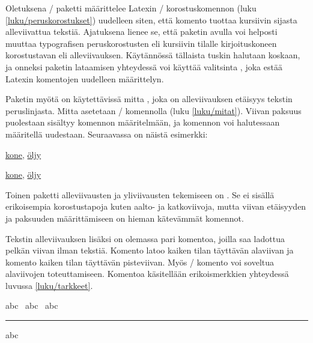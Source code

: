 Oletuksena \-/ paketti määrittelee Latexin
\-/ korostuskomennon (luku \ref{luku/peruskorostukset})
uudelleen siten, että komento tuottaa kursiivin sijasta alleviivattua
tekstiä. Ajatuksena lienee se, että paketin avulla voi helposti muuttaa
typografisen peruskorostusten eli kursiivin tilalle kirjoituskoneen
korostustavan eli alleviivauksen. Käytännössä tällaista tuskin halutaan
koskaan, ja onneksi paketin lataamisen yhteydessä voi käyttää valitsinta
, joka estää Latexin komentojen uudelleen
määrittelyn.

\begin{koodilohkosis}
\usepackage[normalem]{ulem}
\end{koodilohkosis}

\noindent
Paketin  myötä on käytettävissä mitta ,
joka on alleviivauksen etäisyys tekstin peruslinjasta. Mitta asetetaan
\-/ komennolla (luku \ref{luku/mitat}). Viivan
paksuus puolestaan sisältyy komennon  määritelmään,
ja komennon voi halutessaan määritellä uudestaan. Seuraavassa on näistä
esimerkki:

\begin{koodilohkosis}
\setlength{\ULdepth}{.2ex}        %
\renewcommand{\ULthickness}{.1ex} %
\uline{kone}, \uline{öljy}
\end{koodilohkosis}

\begin{tulossis}
  \setlength{\ULdepth}{.2ex}
  \renewcommand{\ULthickness}{.1ex}
  \uline{kone}, \uline{öljy}
\end{tulossis}

\noindent
Toinen paketti alleviivausten ja yliviivausten tekemiseen on
. Se ei sisällä erikoisempia korostustapoja kuten
aalto- ja katkoviivoja, mutta viivan etäisyyden ja paksuuden
määrittämiseen on hieman kätevämmät komennot.

Tekstin alleviivauksen lisäksi on olemassa pari komentoa, joilla saa
ladottua pelkän viivan ilman tekstiä. Komento  latoo
kaiken tilan täyttävän alaviivan ja komento  kaiken
tilan täyttävän pisteviivan. Myös \-/ komento voi soveltua
alaviivojen toteuttamiseen. Komentoa käsitellään erikoismerkkien
yhteydessä luvussa \ref{luku/tarkkeet}.

\begin{koodilohkosis}
abc \hrulefill\ abc \dotfill\ abc \rule[-.3ex]{5em}{.4bp} abc
\end{koodilohkosis}


